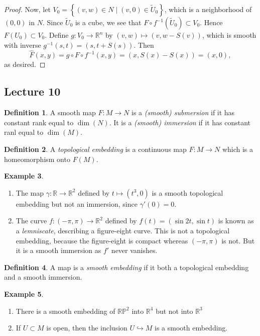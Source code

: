 \documentclass[10pt,letterpaper,cm]{nupset}
\theoremstyle{definition}
\newtheorem{definition}{Definition}[subsection]
\newtheorem{exmp}[definition]{Example}
\theoremstyle{theorem}
\theoremstyle{remark}
\newcommand{\R}{\mathbb R}
\newcommand{\RP}{\mathbb{RP}}
\newcommand{\1}{\mathbf{1}}
\newcommand{\0}{\vec 0}
\begin{document}
\begin{proof}
\medskip

 Now, let $V_0 = \left\{(v,w) \in N \mid (v,0)\in \widetilde{U}_0\right\}$, which is a neighborhood of $(0,0)$ in  $N$. Since $\widetilde{U}_0$ is a cube, we see that $F \circ f^{-1}(\widetilde{U}_0) \subset V_0$. Hence $F(U_0) \subset V_0$.  Define $g : V_0 \to \R^n$ by $(v,w) \mapsto (v, w-S(v))$, which is smooth with inverse $g^{-1}(s,t) = (s, t + S(s))$. Then $$\widehat{F}(x,y) = g \circ F \circ f^{-1}(x,y) = (x, S(x) - S(x)) = (x,0),$$ as desired.
\end{proof}

\subsection{Lecture 10}

\begin{definition}
A smooth map $F: M \to N$ is a \textit{(smooth) submersion} if it has constant rank equal to $\dim(N)$. It is a \textit{(smooth) immersion} if it has constant ranl equal to $\dim(M)$.
\end{definition}

\begin{definition}
A \textit{topological embedding} is a continuous map $F: M \to N$ which is a homeomorphism onto $F(M)$.
\end{definition}

\begin{exmp} $ $
\begin{enumerate}
\item The map $\gamma: \R \to \R^2$ defined by $t\mapsto (t^3, 0)$ is a smooth topological embedding but not an immersion, since $\gamma'(0) =0$.
\item The curve $f: (-\pi, \pi) \to \R^2$ defined by $f(t) = (\sin 2t , \sin t)$ is known as a \textit{lemniscate}, describing a figure-eight curve. This is not a topological embedding, because the figure-eight is compact whereas $(-\pi, \pi)$ is not. But it is a smooth immersion as $f'$ never vanishes. 
\end{enumerate}
\end{exmp}

\begin{definition}
A map is a \textit{smooth embedding} if it both a topological embedding and a smooth immersion.
\end{definition}

\begin{exmp} $ $
\begin{enumerate}
\item There is a smooth embedding of $\RP^2$ into $\R^4$ but not into $\R^3$
\item If $U \subset M$ is open, then the inclusion $U \hookrightarrow M$ is a smooth embedding.
\end{enumerate}
\end{exmp}
\end{document}
